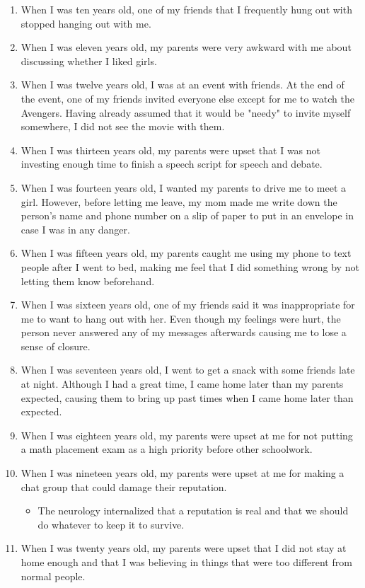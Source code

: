 \documentclass[a4paper, 12pt]{article}
\begin{document}
\begin{enumerate}
  \item When I was ten years old, one of my friends that I frequently hung out with stopped hanging out with me.
  \item When I was eleven years old, my parents were very awkward with me about discussing whether I liked girls.
  \item When I was twelve years old, I was at an event with friends. At the end of the event, one of my friends invited everyone else except for me to watch the Avengers. Having already assumed that it would be "needy" to invite myself somewhere, I did not see the movie with them.
  \item When I was thirteen years old, my parents were upset that I was not investing enough time to finish a speech script for speech and debate.
  \item When I was fourteen years old, I wanted my parents to drive me to meet a girl. However, before letting me leave, my mom made me write down the person's name and phone number on a slip of paper to put in an envelope in case I was in any danger.
  \item When I was fifteen years old, my parents caught me using my phone to text people after I went to bed, making me feel that I did something wrong by not letting them know beforehand.
  \item When I was sixteen years old, one of my friends said it was inappropriate for me to want to hang out with her. Even though my feelings were hurt, the person never answered any of my messages afterwards causing me to lose a sense of closure.
  \item When I was seventeen years old, I went to get a snack with some friends late at night. Although I had a great time, I came home later than my parents expected, causing them to bring up past times when I came home later than expected.
  \item When I was eighteen years old, my parents were upset at me for not putting a math placement exam as a high priority before other schoolwork.
  \item When I was nineteen years old, my parents were upset at me for making a chat group that could damage their reputation.
  \begin{itemize}
    \item The neurology internalized that a reputation is real and that we should do whatever to keep it to survive.
  \end{itemize}
  \item When I was twenty years old, my parents were upset that I did not stay at home enough and that I was believing in things that were too different from normal people.
\end{enumerate}
\end{document}
